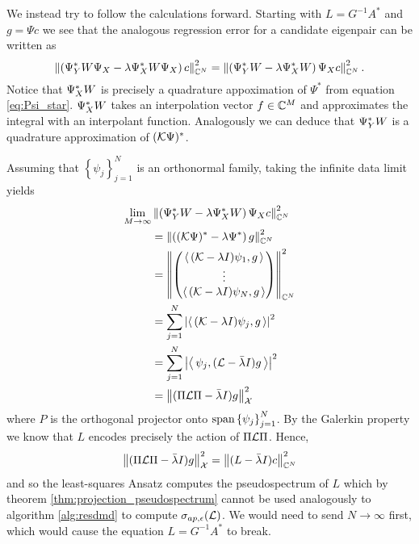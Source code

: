We instead try to follow the calculations forward. Starting with $L = G^{-1} A^*$ 
and $g = \Psi c$ we see that the analogous regression error for a candidate eigenpair can 
be written as 
\begin{equation}
    \left\| \left( \Psi_Y^* W \Psi_X - \lambda \Psi_X^* W \Psi_X \right) c \right\|_{\mathbb{C}^N}^2 
    = \left\| \left( \Psi_Y^* W - \lambda \Psi_X^* W \right) \Psi_X c \right\|_{\mathbb{C}^N}^2 . 
\end{equation}
Notice that $\Psi_X^* W$ is precisely a quadrature appoximation of $\Psi^*$ from equation 
\ref{eq:Psi_star}. $\Psi_X^* W$ takes an interpolation vector $f \in \mathbb{C}^M$ and 
approximates the integral with an interpolant function. Analogously we can deduce that 
$\Psi_Y^* W$ is a quadrature approximation of $(\mathcal{K} \Psi)^*$. 

Assuming that $\left\{ \psi_j \right\}_{j=1}^N$ is an orthonormal family, taking the 
infinite data limit yields
\begin{equation}
    \label{eq:bad_L_pseudospectrum}
    \begin{split}
        \lim_{M \to \infty} &
        \left\| \left( \Psi_Y^* W - \lambda \Psi_X^* W \right) \Psi_X c \right\|_{\mathbb{C}^N}^2 \\
        &= \left\| \left( (\mathcal{K} \Psi)^* - \lambda \Psi^* \right) g \right\|_{\mathbb{C}^N}^2 \\
        &= \left\| \begin{pmatrix}
            \left\langle\, (\mathcal{K} - \lambda I) \psi_1, g \,\right\rangle \\
            \vdots \\
            \left\langle\, (\mathcal{K} - \lambda I) \psi_N, g \,\right\rangle 
        \end{pmatrix} \right\|_{\mathbb{C}^N}^2 \\
        &= \sum_{j=1}^{N} \left| \left\langle\, (\mathcal{K} - \lambda I) \psi_j, g \,\right\rangle \right|^2 \\
        &= \sum_{j=1}^{N} \left| \left\langle\, \psi_j, (\mathcal{L} - \bar{\lambda} I) g \,\right\rangle \right|^2 \\
        &= \left\| (\Pi \mathcal{L} \Pi - \bar{\lambda} I) g \right\|_{\mathcal{X}}^2
    \end{split}
\end{equation}
where $P$ is the orthogonal projector onto $\text{span} \left\{ \psi_j \right\}_{j=1}^N$. By 
the Galerkin property we know that $L$ encodes precisely the action of $\Pi \mathcal{L} \Pi$. Hence, 
\begin{equation}
    \label{eq:PLP}
    \left\| (\Pi \mathcal{L} \Pi - \bar{\lambda} I) g \right\|_{\mathcal{X}}^2
    = \left\| (L - \bar{\lambda} I) c \right\|_{\mathbb{C}^N}^2 
\end{equation}
and so the least-squares Ansatz computes the pseudospectrum of $L$ which by theorem 
\ref{thm:projection_pseudospectrum} 
cannot be used analogously to algorithm \ref{alg:resdmd} to compute 
$\sigma_{ap,\epsilon} (\mathcal{L})$. We would need to send $N \to \infty$ first, which would 
cause the equation $L = G^{-1} A^*$ to break. 

